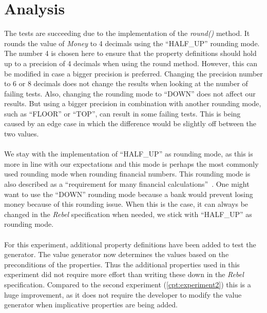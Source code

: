 \section{Analysis}
The tests are succeeding due to the implementation of the \textit{round()}
method. It rounds the value of \textit{Money} to 4 decimals using the
``HALF\_UP'' rounding mode. The number 4 is chosen here to ensure that the
property definitions should hold up to a precision of 4 decimals when using the
round method. However, this can be modified in case a bigger precision is
preferred. Changing the precision number to 6 or 8 decimals does not change the
results when looking at the number of failing tests. Also, changing the rounding
mode to ``DOWN'' does not affect our results. But using a bigger precision in
combination with another rounding mode, such as ``FLOOR'' or ``TOP'', can result
in some failing tests. This is being caused by an edge case in which the
difference would be slightly off between the two values.\\
\\
We stay with the implementation of ``HALF\_UP'' as rounding mode, as this is
more in line with our expectations and this mode is perhaps the most commonly
used rounding mode when rounding financial numbers. This rounding mode is also
described as a
``requirement for many financial calculations''~\cite{cowlishaw2003decimal}. One
might want to use the ``DOWN'' rounding mode because a bank would prevent losing
money because of this rounding issue. When this is the case, it can always be
changed in the \textit{Rebel} specification when needed, we stick with
``HALF\_UP'' as rounding mode.\\
\\
For this experiment, additional property definitions have been added to test the
generator. The value generator now determines the values based on the
preconditions of the properties. Thus the additional properties used in this
experiment did not require more effort than writing these down in the \textit{Rebel}
specification. Compared to the second experiment (\autoref{cpt:experiment2})
this is a huge improvement, as it does not require the developer to modify the
value generator when implicative properties are being added.\\
\\
